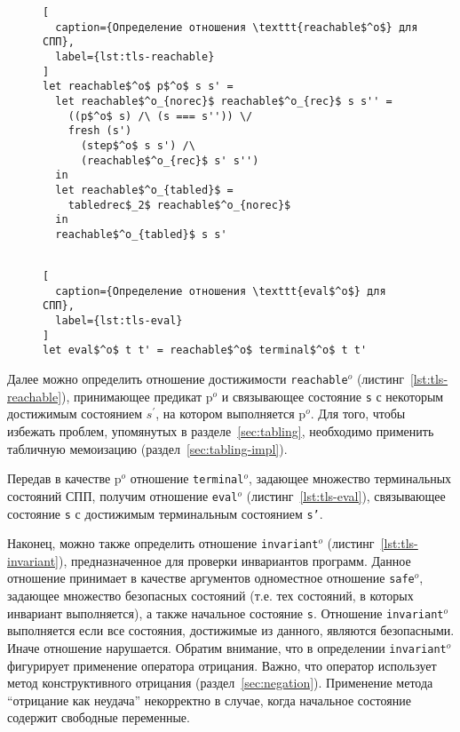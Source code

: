 \begin{figure}[thb]
\begin{minipage}{\linewidth}
\begin{lstlisting}[
  caption={Определение отношения \texttt{reachable$^o$} для СПП},
  label={lst:tls-reachable}
]
let reachable$^o$ p$^o$ s s' = 
  let reachable$^o_{norec}$ reachable$^o_{rec}$ s s'' = 
    ((p$^o$ s) /\ (s === s'')) \/
    fresh (s')
      (step$^o$ s s') /\ 
      (reachable$^o_{rec}$ s' s'')
  in
  let reachable$^o_{tabled}$ = 
    tabledrec$_2$ reachable$^o_{norec}$
  in
  reachable$^o_{tabled}$ s s'
  
\end{lstlisting}
\end{minipage}
\end{figure}

\begin{figure}[thb]
\begin{minipage}{\linewidth}
\begin{lstlisting}[
  caption={Определение отношения \texttt{eval$^o$} для СПП},
  label={lst:tls-eval}
]
let eval$^o$ t t' = reachable$^o$ terminal$^o$ t t'
\end{lstlisting}
\end{minipage}
\end{figure}

Далее можно определить отношение достижимости \texttt{reachable$^o$} (листинг~\ref{lst:tls-reachable}),
принимающее предикат p$^o$ и 
связывающее состояние \texttt{s} с некоторым достижимым состоянием \texttt{$s^\prime$},
на котором выполняется p$^o$.
Для того, чтобы избежать проблем, упомянутых в разделе~\ref{sec:tabling},
необходимо применить табличную мемоизацию (раздел~\ref{sec:tabling-impl}).

Передав в качестве p$^o$ отношение \texttt{terminal$^o$},
задающее множество терминальных состояний СПП,
получим отношение \texttt{eval$^o$} (листинг~\ref{lst:tls-eval}), 
связывающее состояние \texttt{s} с достижимым терминальным состоянием \texttt{s'}.

Наконец, можно также определить 
отношение \texttt{invariant$^o$} (листинг~\ref{lst:tls-invariant}), 
предназначенное для проверки инвариантов программ.
Данное отношение принимает в качестве аргументов
одноместное отношение \texttt{safe$^o$},
задающее множество безопасных состояний 
(т.е. тех состояний, в которых инвариант выполняется),
а также начальное состояние \texttt{s}.
Отношение \texttt{invariant$^o$} выполняется 
если все состояния, достижимые из данного, являются безопасными. 
Иначе отношение нарушается.
Обратим внимание, что в определении \texttt{invariant$^o$}
фигурирует применение оператора отрицания.
Важно, что оператор использует метод конструктивного отрицания (раздел~\ref{sec:negation}).
Применение метода ``отрицание как неудача'' некорректно в случае, 
когда начальное состояние содержит свободные переменные.

